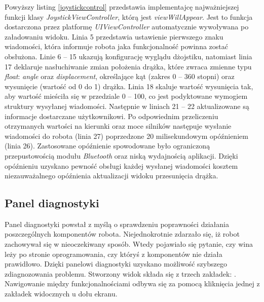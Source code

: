 Powyższy listing \ref{joystickcontrol} przedstawia implementajcę najważniejszej funkcji klasy \textit{JoystickViewController}, którą jest \textit{viewWillAppear}. Jest to funkcja dostarczona przez platformę \textit{UIViewController} automatycznie wywoływana po załadowaniu widoku. Linia 5 przedstawia ustawienie pierwszego znaku wiadomości, która informuje robota jaka funkcjonalność powinna zostać obsłużona. Linie 6 – 15 ukazują konfigurację wyglądu dżojstiku, natomiast linia 17 deklaruje nasłuchiwanie zmian położenia drążka, które zwraca zmienne typu \textit{float}: \textit{angle} oraz \textit{displacement}, określające kąt (zakres 0 – 360 stopni) oraz wysunięcie (wartość od 0 do 1) drążka. Linia 18 skaluje wartość wysunięcia tak, aby wartość mieściła się w przedziale 0 – 100, co jest podyktowane wymogiem struktury wysyłanej wiadomości. Następnie w liniach 21 – 22 aktualizowane są informacje dostarczane użytkownikowi. Po odpowiednim przeliczeniu otrzymanych wartości na kierunki oraz moce silników następuje wysłanie wiadomości do robota (linia 27) poprzedzone 20 milisekundowym opóźnieniem (linia 26). Zastosowane opóźnienie spowodowane było ograniczoną przepustowością modułu \textit{Bluetooth} oraz niską wydajnością aplikacji. Dzięki opóźnieniu uzyskano pewność obsługi każdej wysłanej wiadomości kosztem niezauważalnego opóźnienia aktualizacji widoku przesunięcia drążka.

\subsection{Panel diagnostyki}
Panel diagnostyki powstał z myślą o sprawdzeniu poprawności działania poszczególnych komponentów robota. Niejednokrotnie zdarzało się, iż robot zachowywał się w nieoczekiwany sposób. Wtedy pojawiało się pytanie, czy wina leży po stronie oprogramowania, czy któryś z komponentów nie działa prawidłowo. Dzięki panelowi diagnostyki uzyskano możliwość szybszego zdiagnozowania problemu. 
Stworzony widok składa się z trzech zakładek: . Nawigowanie między funkcjonalnościami odbywa się za pomocą kliknięcia jednej z zakładek widocznych u dołu ekranu. 

